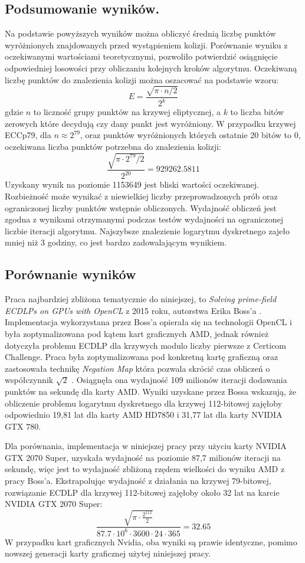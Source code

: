 \subsection{Podsumowanie wyników.}
Na podstawie powyższych wyników można obliczyć średnią liczbę punktów wyróżnionych
znajdowanych przed wystąpieniem kolizji.
Porównanie wyniku z oczekiwanymi wartościami teoretycznymi, pozwoliło potwierdzić
osiągnięcie odpowiedniej losowości przy obliczaniu kolejnych kroków algorytmu.
Oczekiwaną liczbę punktów do znalezienia kolizji można oszacować na podstawie wzoru:
$$
    E = \frac{\sqrt{\pi \cdot n / 2}}{2^k}
$$
gdzie $n$ to liczność grupy punktów na krzywej eliptycznej, a $k$ to liczba bitów zerowych które decydują
czy dany punkt jest wyróżniony. W przypadku krzywej ECCp79,
dla $n \approx 2^{79}$, oraz punktów wyróżnionych których ostatnie 20 bitów to $0$, oczekiwana liczba
punktów potrzebna do znalezienia kolizji:
$$
    \frac{\sqrt{\pi \cdot 2^{79} / 2}}{2^{20}} = 929262.5811
$$
Uzyskany wynik na poziomie 1153649 jest bliski wartości oczekiwanej. Rozbieżność może wynikać z niewielkiej
liczby przeprowadzonych prób oraz ograniczonej liczby punktów wstępnie obliczonych.
Wydajność obliczeń jest zgodna z wynikami otrzymanymi podczas testów wydajności na ograniczonej liczbie iteracji algorytmu.
Najszybsze znalezienie logarytmu dyskretnego zajeło mniej niż 3 godziny, co jest bardzo zadowalającym wynikiem.

\subsection{Porównanie wyników}
Praca najbardziej zbliżona tematycznie do niniejszej, to \textit{Solving prime-field
    ECDLPs on GPUs with OpenCL} z 2015 roku, autorstwa Erika Boss'a \cite{Boss2015}.
Implementacja wykorzystana przez Boss'a opierała się na technologii
OpenCL i była zoptymalizowana pod kątem kart graficznych AMD, jednak również
dotyczyła problemu ECDLP dla krzywych modulo liczby pierwsze z Certicom Challenge.
Praca była zoptymalizowana pod konkretną kartę graficzną
oraz zastosowała technikę \textit{Negation Map} która pozwala skrócić czas obliczeń
o współczynnik $\sqrt{2}$ \cite{Negation}.
Osiągnęła ona wydajność 109 milionów iteracji dodawania punktów na sekundę dla karty AMD.
Wyniki uzyskane przez Bossa wskazują, że obliczenie
problemu logarytmu dyskretnego dla krzywej 112-bitowej zajęłoby odpowiednio 19,81
lat dla karty AMD HD7850 i 31,77 lat dla karty NVIDIA GTX 780.

Dla porównania, implementacja w niniejszej pracy przy użyciu karty NVIDIA GTX 2070
Super, uzyskała wydajność na poziomie 87,7 milionów iteracji na sekundę,
więc jest to wydajność zbliżoną rzędem wielkości do wyniku AMD z pracy Boss'a.
Ekstrapolując wydajność z działania na krzywej 79-bitowej,
rozwiązanie ECDLP dla krzywej 112-bitowej zajęłoby około 32 lat na karcie NVIDIA GTX 2070 Super:
$$
    \frac{\sqrt{\pi \cdot \frac{2^{112}}{2}}}{87.7 \cdot 10^{6} \cdot 3600 \cdot 24 \cdot 365} = 32.65
$$
W przypadku kart graficznych Nvidia, oba wyniki są prawie identyczne,
pomimo nowszej generacji karty graficznej użytej niniejszej pracy.

